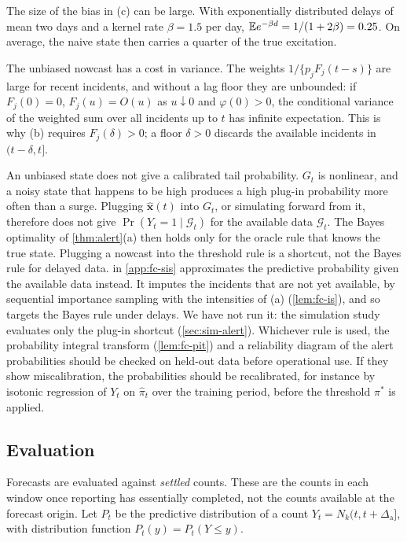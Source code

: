 The size of the bias in (c) can be large. With exponentially distributed delays of mean
two days and a kernel rate $\beta=1.5$ per day, $\mathbb{E} e^{-\beta d}=1/(1+2\beta)=0.25$. On
average, the naive state then carries a quarter of the true excitation.

The unbiased nowcast has a cost in variance. The weights $1/\{p_jF_j(t-s)\}$ are large
for recent incidents, and without a lag floor they are unbounded: if $F_j(0)=0$,
$F_j(u)=O(u)$ as $u\downarrow0$ and $\varphi(0)>0$, the conditional variance of the weighted
sum over all incidents up to $t$ has infinite expectation. This is why (b) requires
$F_j(\delta)>0$; a floor $\delta>0$ discards the available incidents in $(t-\delta,t]$.

An unbiased state does not give a calibrated tail probability. $G_t$ is nonlinear, and
a noisy state that happens to be high produces a high plug-in probability more often
than a surge. Plugging $\hat{\bm x}(t)$ into $G_t$, or simulating forward from it,
therefore does not give $\Pr(Y_t=1\mid\mathcal G_t)$ for the available data
$\mathcal G_t$. The Bayes optimality of \cref{thm:alert}(a) then holds only for the
oracle rule that knows the true state. Plugging a nowcast into the threshold rule is a
shortcut, not the Bayes rule for delayed data.  in \cref{app:fc-sis}
approximates the predictive probability given the available data instead. It imputes the
incidents that are not yet available, by sequential importance sampling with the
intensities of (a) (\cref{lem:fc-is}), and so targets the Bayes rule under delays. We have
not run it: the simulation study evaluates only the plug-in shortcut
(\cref{sec:sim-alert}). Whichever rule is used, the probability integral transform
(\cref{lem:fc-pit}) and a reliability diagram of the alert probabilities should be checked
on held-out data before operational use. If they show miscalibration, the probabilities
should be recalibrated, for instance by isotonic regression of $Y_t$ on $\hat\pi_t$ over
the training period, before the threshold $\pi^*$ is applied.

\subsection{Evaluation}\label{sec:fc-eval}

Forecasts are evaluated against \emph{settled} counts. These are the counts in each
window once reporting has essentially completed, not the counts available at the
forecast origin. Let $P_t$ be the predictive distribution of a count
$Y_t=N_k(t,t+\Delta_{\mathrm a}]$, with distribution function $P_t(y)=P_t(Y\le y)$.

